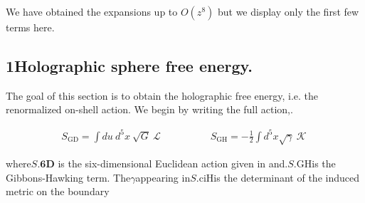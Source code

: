 \documentclass{article}
\begin{document}
We have obtained the expansions up to $O ( z ^ { 8 } )$ but we display only the first few terms here.


\subsection*{1Holographic sphere free energy.}


The goal of this section is to obtain the holographic free energy, i.e. the renormalized on-shell
action. We begin by writing the full action,.


\begin{equation}
\begin{array} { r } { S _ { \mathrm { G D } } = \int d u ~ d ^ { 5 } x ~ \sqrt { G } ~ \mathcal { L } \qquad \qquad \quad S _ { \mathrm { G H } } = - \frac { 1 } { 2 } \int d ^ { 5 } x \sqrt { \gamma } ~ \mathcal { K } ~ }\end{array}
\end{equation}


where$S . { \mathbf { 6 D } }$ is the six-dimensional Euclidean action given in and.$S . { \mathrm { G H } }$is the Gibbons-Hawking
term. The$\gamma$appearing in$S . { \mathrm { c i H } }$is the determinant of the induced metric on the boundary
\end{document}
